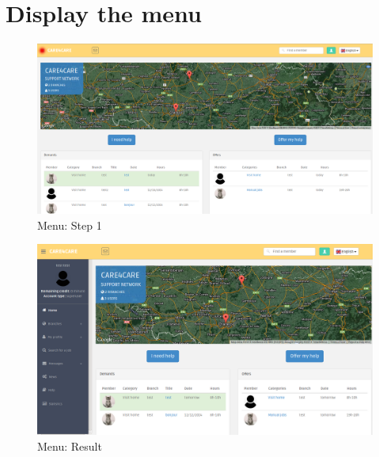 \documentclass{article}
\begin{document}
\clearpage
\section{Display the menu}
\begin{figure}[!ht]
   \includegraphics[width=\textwidth]{img/menu1.png}
   \caption{Menu: Step 1}
\end{figure}
\begin{figure}[!ht]
   \includegraphics[width=\textwidth]{img/menu2.png}
   \caption{Menu: Result}
\end{figure}

\clearpage
\end{document}
